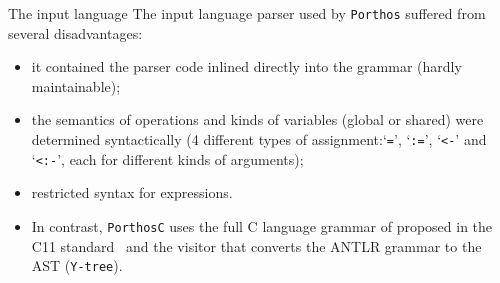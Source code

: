 \documentclass{beamer}
\begin{document}
\begin{frame}{The input language}
The input language parser used by \texttt{Porthos} suffered from several disadvantages:
\begin{itemize}
\item it contained the parser code inlined directly into the grammar (hardly maintainable);
\item the semantics of operations and kinds of variables (global or shared) were determined syntactically (4 different types of assignment:`\lstinline{=}', `\lstinline{:=}', `\lstinline{<-}' and `\lstinline{<:-}', each for different kinds of arguments);
\item restricted syntax for expressions.
\item In contrast, \texttt{PorthosC} uses the full C language grammar of proposed in the C11 standard~\cite{jtc2011sc22} and the visitor that converts the ANTLR grammar to the AST (\texttt{Y-tree}).
\end{itemize}

\end{frame}
\end{document}
